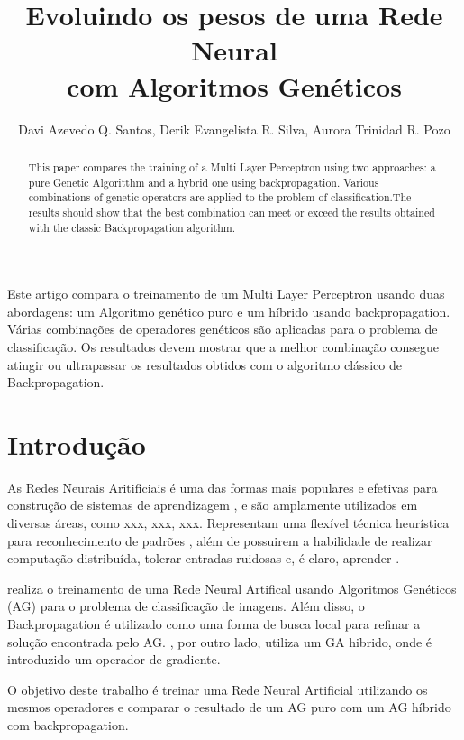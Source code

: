 \documentclass[12pt]{article}
\title{Evoluindo os pesos de uma Rede Neural \\com Algoritmos Genéticos}
\author{Davi Azevedo Q. Santos\inst{1}, Derik Evangelista R. Silva\inst{1}, Aurora Trinidad R. Pozo\inst{1}}
\begin{document}
 

\maketitle

\begin{abstract}
This paper compares the training of a Multi Layer Perceptron using two approaches: a pure Genetic Algoritthm and a hybrid one using backpropagation. Various combinations of genetic operators are applied to the problem of classification.The results should show that the best combination can meet or exceed the results obtained with the classic Backpropagation algorithm.
\end{abstract}
     
\begin{resumo} 
Este artigo compara o treinamento de um Multi Layer Perceptron usando duas abordagens: um Algoritmo 
genético puro e um híbrido usando backpropagation. Várias combinações de operadores genéticos são 
aplicadas para o problema de classificação. Os resultados devem mostrar que a melhor combinação consegue atingir ou ultrapassar os resultados obtidos com o algoritmo clássico de Backpropagation.
\end{resumo}

\section{Introdução}

\par As Redes Neurais Aritificiais é uma das formas mais populares e efetivas para construção de sistemas de aprendizagem \cite{russel}, e são amplamente utilizados em diversas áreas, como xxx, xxx, xxx. Representam uma flexível técnica heurística para reconhecimento de padrões \cite{duda}, além de possuirem a habilidade de realizar computação distribuída, tolerar entradas ruidosas e, é claro, aprender \cite{russel}.

\par \cite{Liu} realiza o treinamento de uma Rede Neural Artifical usando Algoritmos Genéticos (AG) para o problema de classificação de imagens. Além disso, o Backpropagation é utilizado como uma forma de busca local para refinar a solução encontrada pelo AG. \cite{montana}, por outro lado, utiliza um GA hibrido, onde é introduzido um operador de gradiente.

O objetivo deste trabalho é treinar uma Rede Neural Artificial utilizando os mesmos operadores e comparar o resultado de um AG puro com um AG híbrido com backpropagation.
\end{document}
